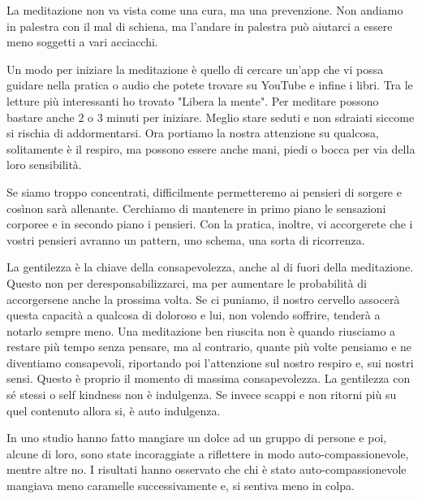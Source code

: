 \documentclass[12pt]{book} %
\begin{document}
La meditazione non va vista come una cura, ma una prevenzione. Non andiamo in palestra con il mal di schiena, ma l'andare in palestra può aiutarci a essere meno soggetti a vari acciacchi.

Un modo per iniziare la meditazione è quello di cercare un'app che vi possa guidare nella pratica o audio che potete trovare su YouTube e infine i libri. Tra le letture più interessanti ho trovato "Libera la mente". 
Per meditare possono bastare anche 2 o 3 minuti per iniziare. Meglio stare seduti e non sdraiati siccome si rischia di addormentarsi.
Ora portiamo la nostra attenzione su qualcosa, solitamente è il respiro, ma possono essere anche mani, piedi o bocca per via della loro sensibilità. 

Se siamo troppo concentrati, difficilmente permetteremo ai pensieri di sorgere e cosìnon sarà allenante.
Cerchiamo di mantenere in primo piano le sensazioni corporee e in secondo piano i pensieri.
Con la pratica, inoltre, vi accorgerete che i vostri pensieri avranno un pattern, uno schema, una sorta di ricorrenza.

La gentilezza è la chiave della consapevolezza, anche al di fuori della meditazione. Questo non per deresponsabilizzarci, ma per aumentare le probabilità di
accorgersene anche la prossima volta. Se ci puniamo, il nostro cervello assocerà questa capacità a qualcosa di doloroso e lui, non volendo soffrire, tenderà a notarlo sempre meno. Una meditazione ben riuscita non è quando riusciamo a restare più tempo senza pensare, ma al contrario, quante più volte pensiamo e ne diventiamo consapevoli, riportando poi l'attenzione sul nostro respiro e, sui nostri sensi. Questo è proprio il momento di massima
consapevolezza. 
La gentilezza con sé stessi o self kindness non è indulgenza. Se invece scappi e non ritorni più su quel contenuto allora si, è auto indulgenza.

In uno studio hanno fatto mangiare un dolce ad un gruppo di persone e poi, alcune di loro, sono state incoraggiate a riflettere in modo auto-compassionevole, mentre altre no. I risultati hanno osservato che chi è stato auto-compassionevole mangiava meno caramelle successivamente e, si sentiva meno in colpa.
\end{document}
